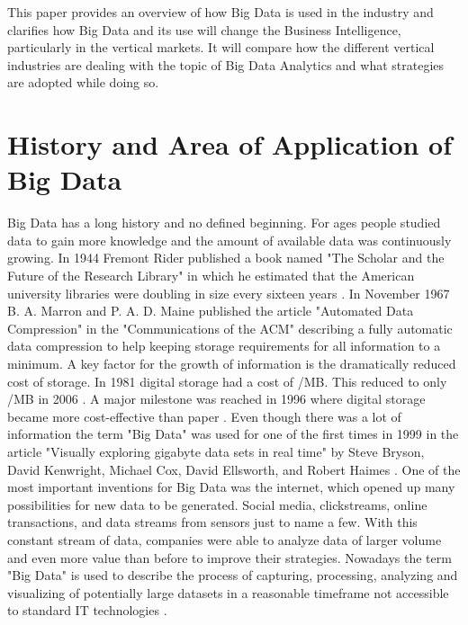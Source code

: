 \documentclass[runningheads]{llncs}
\begin{document}
This paper provides an overview of how Big Data is used in the industry and clarifies how Big Data and its use will change the Business Intelligence, particularly in the vertical markets. It will compare how the different vertical industries are dealing with the topic of Big Data Analytics and what strategies are adopted while doing so.

\section{History and Area of Application of Big Data}
Big Data has a long history and no defined beginning. For ages people studied data to gain more knowledge and the amount of available data was continuously growing. In 1944 Fremont Rider published a book named "The Scholar and the Future of the Research Library" in which he estimated that the American university libraries were doubling in size every sixteen years \cite{PRESS}. In November 1967 B. A. Marron and P. A. D. Maine published the article "Automated Data Compression" in the "Communications of the ACM" \cite{MARRON} describing a fully automatic data compression to help keeping storage requirements for all information to a minimum. A key factor for the growth of information is the dramatically reduced cost of storage. In 1981 digital storage had a cost of /MB. This reduced to only /MB in 2006 \cite{PCMAGAZINE}. A major milestone was reached in 1996 where digital storage became more cost-effective than paper \cite{MORRIS}. 
Even though there was a lot of information the term "Big Data" was used for one of the first times in 1999 in the article "Visually exploring gigabyte data sets in real time" by Steve Bryson, David Kenwright, Michael Cox, David Ellsworth, and Robert Haimes \cite{PRESS}. One of the most important inventions for Big Data was the internet, which opened up many possibilities for new data to be generated. Social media, clickstreams, online transactions, and data streams from sensors just to name a few. With this constant stream of data, companies were able to analyze data of larger volume and even more value than before to improve their strategies.
Nowadays the term "Big Data" is used to describe the process of capturing, processing, analyzing and visualizing of potentially large datasets in a reasonable timeframe not accessible to standard IT technologies \cite{NESSI}. 
\end{document}
